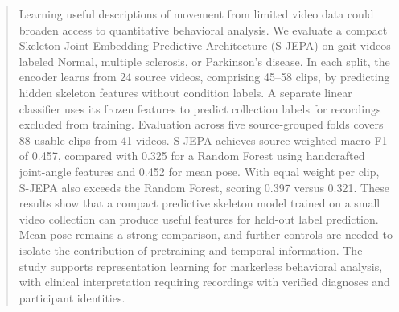 \begin{abstract}
Learning useful descriptions of movement from limited video data could broaden access to quantitative behavioral analysis. We evaluate a compact Skeleton Joint Embedding Predictive Architecture (S-JEPA) on gait videos labeled Normal, multiple sclerosis, or Parkinson's disease. In each split, the encoder learns from 24 source videos, comprising 45--58 clips, by predicting hidden skeleton features without condition labels. A separate linear classifier uses its frozen features to predict collection labels for recordings excluded from training. Evaluation across five source-grouped folds covers 88 usable clips from 41 videos. S-JEPA achieves source-weighted macro-F1 of 0.457, compared with 0.325 for a Random Forest using handcrafted joint-angle features and 0.452 for mean pose. With equal weight per clip, S-JEPA also exceeds the Random Forest, scoring 0.397 versus 0.321. These results show that a compact predictive skeleton model trained on a small video collection can produce useful features for held-out label prediction. Mean pose remains a strong comparison, and further controls are needed to isolate the contribution of pretraining and temporal information. The study supports representation learning for markerless behavioral analysis, with clinical interpretation requiring recordings with verified diagnoses and participant identities.
\end{abstract}
